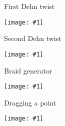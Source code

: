 \documentclass[final,t, mathserif]{beamer}
\newcommand{\img}[1]{
\vfill
\centering
\texttt{[image: \#1]}
\vfill}
\theoremstyle{plain}
\newtheorem{prop}[thm]{Proposition}
\theoremstyle{definition}
\begin{document}
\begin{frame}{}
\begin{columns}[t]
\begin{column}{.3\linewidth}
  
\begin{block}{First Dehn twist}
\img{t1}
\end{block}

\begin{block}{Second Dehn twist}
\img{t2}
\end{block}

\begin{block}{Braid generator}
\img{t3}
\end{block}

\begin{block}{Dragging a point}
\img{t4}
\end{block}






\end{column}
\end{columns}
\end{frame}
\end{document}
